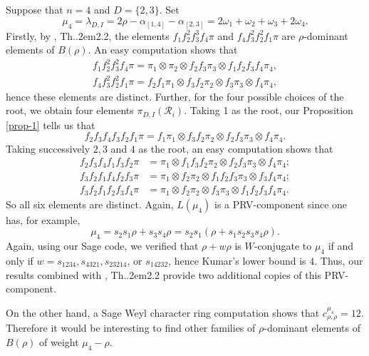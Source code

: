 \documentclass[12pt]{amsart}
\numberwithin{equation}{section}
\theoremstyle{definition}
\def\Th{Th.\kern.2em}
\def\calR{\mathcal{R}} %
\begin{document}
\subsection{} Suppose that $n=4$ and $D = \{2,3\}$. Set 
\begin{equation} 
\mu_4 = \lambda_{D,I} = 2\rho -\alpha_{[1,4]} - \alpha_{[2,3]} = 2 \omega_1 + \omega_2 + \omega_3 + 2\omega_4.
\end{equation} 
Firstly, by \cite{BG25}, \Th 2.2, the elements 
$f_1 f_2^2 f_3^3 f_4 \pi$ and $f_4 f_3^2 f_2^2 f_1 \pi$ are $\rho$-dominant elements 
of $B(\rho)$. An easy computation shows that 
\begin{gather} 
f_1 f_2^2 f_3^2 f_4 \pi = \pi_1 \otimes \pi_2 \otimes f_2 f_3 \pi_3 \otimes f_1 f_2 f_3 f_4 \pi_4 , 
\\
f_4 f_3^2 f_2^2 f_1 \pi = f_2 f_1 \pi_1 \otimes f_3 f_2 \pi_2 \otimes f_3 \pi_3 \otimes f_4 \pi_4 , 
\end{gather}
hence these elements are distinct. Further, for the  four possible choices of the root, we 
obtain four elements $\pi_{D, I}(\calR_i)$. Taking 1 as the root, our Proposition \ref{prop-1} 
tells us that 
\begin{equation} 
f_2 f_3 f_4 f_3 f_2 f_1  \pi = f_1 \pi_1 \otimes f_3 f_2 \pi_2 \otimes f_2 f_3 \pi_3 \otimes f_4 \pi_4 . 
\end{equation}
Taking successively $2, 3$ and $4$ as the root, an easy computation shows that 
\begin{align} 
f_2 f_3 f_4 f_1 f_3 f_2 \pi &= \pi_1 \otimes f_1 f_3 f_2\pi_2 \otimes f_2 f_3 \pi_3 \otimes  f_4 \pi_4 ; 
\\
f_3 f_2 f_1 f_4 f_2 f_3 \pi &= \pi_1 \otimes f_2 \pi_2 \otimes f_1 f_2 f_3 \pi_3 \otimes f_3 f_4 \pi_4 ;
\\
f_3 f_2 f_1 f_2 f_3 f_4 \pi &= \pi_1 \otimes f_2 \pi_2 \otimes f_3 \pi_3 \otimes f_1 f_2  f_3 f_4 \pi_4 . 
\end{align}
So all six elements are distinct. Again, $L(\mu_4)$ is a PRV-component since one has, 
for example, 
$$
\mu_4 = s_2 s_1 \rho + s_3 s_4 \rho = s_2 s_1 (\rho + s_1 s_2 s_3 s_4 \rho). 
$$
Again, using our Sage code, we verified that $\rho + w\rho$ is $W$-conjugate to $\mu_4$ if and only if $w = 
s_{1234}, s_{4321}, s_{23214}$, or $s_{14232}$, hence Kumar's lower bound is $4$. 
Thus, our results combined with \cite{BG25}, \Th 2.2 provide two additional copies of this PRV-component. 

On the other hand, a Sage Weyl character ring computation shows that $c_{\rho,\rho}^{\mu_4} = 12$. 
Therefore it would be interesting to find other families of $\rho$-dominant elements of $B(\rho)$ of weight 
$\mu_4 - \rho$. 
\end{document}
